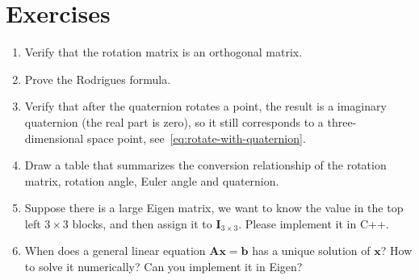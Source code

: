 \section*{Exercises}
\begin{enumerate}
	\item Verify that the rotation matrix is an orthogonal matrix.
	\item Prove the Rodrigues formula.
	\item Verify that after the quaternion rotates a point, the result is a imaginary quaternion (the real part is zero), so it still corresponds to a three-dimensional space point, see~\eqref{eq:rotate-with-quaternion}.
	\item Draw a table that summarizes the conversion relationship of the rotation matrix, rotation angle, Euler angle and quaternion.
	\item Suppose there is a large Eigen matrix, we want to know the value in the top left $3 \times 3$ blocks, and then assign it to $\mathbf{I}_{3 \times 3}$. Please implement it in C++.
	\item When does a general linear equation $\mathbf{A} \mathbf{x}=\mathbf{b}$ has a unique solution of $\mathbf{x}$? How to solve it numerically? Can you implement it in Eigen?
\end{enumerate}
